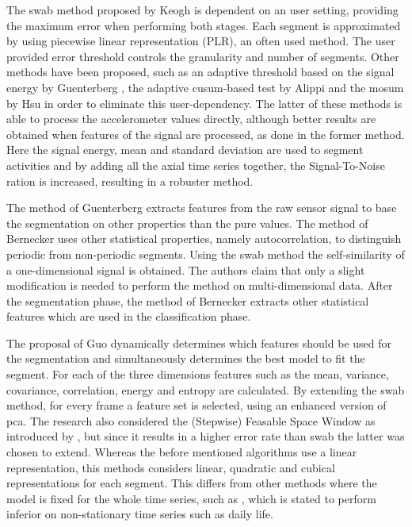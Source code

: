 The \gls{swab} method proposed by Keogh \etal \cite{keogh2001online} is dependent on an user setting, providing the maximum error when performing both stages.
Each segment is approximated by using piecewise linear representation (PLR), an often used method.
The user provided error threshold controls the granularity and number of segments.
Other methods have been proposed, such as an adaptive threshold based on the signal energy by Guenterberg \etal \cite{guenterberg2009automatic}, the adaptive \gls{cusum}-based test by Alippi \etal \cite{alippi2006adaptive} and the \gls{mosum} by Hsu \cite{hsu2007mosum} in order to eliminate this user-dependency.
The latter of these methods is able to process the accelerometer values directly, although better results are obtained when features of the signal are processed, as done in the former method.
Here the signal energy, mean and standard deviation are used to segment activities and by adding all the axial time series together, the Signal-To-Noise ration is increased, resulting in a robuster method.

The method of Guenterberg \etal extracts features from the raw sensor signal to base the segmentation on other properties than the pure values.
The method of Bernecker \etal \cite{bernecker2012activity} uses other statistical properties, namely autocorrelation, to distinguish periodic from non-periodic segments.
Using the \gls{swab} method the self-similarity of a one-dimensional signal is obtained.
The authors claim that only a slight modification is needed to perform the method on multi-dimensional data.
After the segmentation phase, the method of Bernecker \etal extracts other statistical features which are used in the classification phase.

The proposal of Guo \etal \cite{guo2012adaptive} dynamically determines which features should be used for the segmentation and simultaneously determines the best model to fit the segment.
For each of the three dimensions features such as the mean, variance, covariance, correlation, energy and entropy are calculated.
By extending the \gls{swab} method, for every frame a feature set is selected, using an enhanced version of \gls{pca}.
The research also considered the (Stepwise) Feasable Space Window as introduced by \cite{liu2008novel}, but since it results in a higher error rate than \gls{swab} the latter was chosen to extend.
Whereas the before mentioned algorithms use a linear representation, this methods considers linear, quadratic and cubical representations for each segment.
This differs from other methods where the model is fixed for the whole time series, such as \cite{fuchs2010online}, which is stated to perform inferior on non-stationary time series such as daily life.

